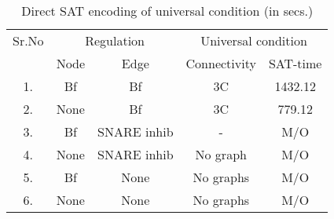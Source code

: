 \begin{table}[t]
	\centering
	    \def\arraystretch{1.1}
		\begin{tabular}[t]{|c|c|c|c|c|}\hline
			
			{\multirow{2}{*} {Sr.No}}  & \multicolumn{2}{c|}{Regulation} & \multicolumn{2}{c|}{Universal condition} 
			
			

			
			\\\cline{2-5}
			{} & {Node} & {Edge} & {Connectivity} & {SAT-time} 
			
			\\\hline
			1. & Bf & Bf & 3C & 1432.12  \\\hline
			2. & None & Bf  & 3C & 779.12 \\\hline
			3. & Bf & SNARE inhib & - & M/O  \\\hline
			4. & None & SNARE inhib  & No graph & M/O\\\hline
			5. & Bf & None  & No graphs & M/O  \\\hline
			6. &  None & None  & No graphs & M/O \\\hline
			
	\end{tabular}
	\caption{ Direct SAT encoding of universal condition (in secs.)}
	\label{tab:satqbf-graph}
\end{table}